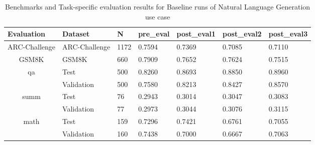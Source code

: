 \begin{table}[H]
\centering
\caption{Benchmarks and Task-specific evaluation results for Baseline runs of Natural Language Generation use case}
\begin{tabular}{|c|l|l|l|l|l|l|}
\hline
\multicolumn{1}{|l|}{Evaluation} & Dataset       & N & pre\_eval & post\_eval1 & post\_eval2 & post\_eval3 \\ \hline
ARC-Challenge                    & ARC-Challenge & 1172            & 0.7594    & 0.7369      & 0.7085      & 0.7110      \\ \hline
GSM8K                            & GSM8K         & 660             & 0.7909    & 0.7652      & 0.7624      & 0.7515      \\ \hline
\multirow{2}{*}{qa}              & Test          & 500             & 0.8260    & 0.8693      & 0.8850      & 0.8960      \\ \cline{2-7} 
                                 & Validation    & 500             & 0.7580    & 0.8213      & 0.8427      & 0.8570      \\ \hline
\multirow{2}{*}{summ}            & Test          & 76              & 0.2943    & 0.3014      & 0.3047      & 0.3083      \\ \cline{2-7} 
                                 & Validation    & 77              & 0.2973    & 0.3044      & 0.3076      & 0.3115      \\ \hline
\multirow{2}{*}{math}            & Test          & 159             & 0.7296    & 0.7421      & 0.6761      & 0.7055      \\ \cline{2-7} 
                                 & Validation    & 160             & 0.7438    & 0.7000      & 0.6667      & 0.7063      \\ \hline
\end{tabular}
\label{tab:TraceBaselineCombined}
\end{table}